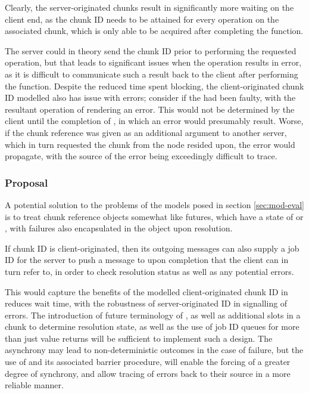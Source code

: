 Clearly, the server-originated chunks result in significantly more waiting on the client end, as the chunk ID needs to be attained for every operation on the associated chunk, which is only able to be acquired after completing the function.

The server could in theory send the chunk ID prior to performing the requested operation, but that leads to significant issues when the operation results in error, as it is difficult to communicate such a result back to the client after performing the function.
Despite the reduced time spent blocking, the client-originated chunk ID modelled also has issue with errors; consider if the  had been faulty, with the resultant operation of  rendering an error.
This would not be determined by the client until the completion of , in which an error would presumably result.
Worse, if the chunk reference  was given as an additional argument to another server, which in turn requested the chunk  from the node  resided upon, the error would propagate, with the source of the error being exceedingly difficult to trace.

\subsubsection{Proposal}

A potential solution to the problems of the models posed in section \cref{sec:mod-eval} is to treat chunk reference objects somewhat like futures, which have a state of  or , with failures also encapsulated in the object upon resolution\cite{bengtsson20:future-r}.

If chunk ID is client-originated, then its outgoing messages can also supply a job ID for the server to push a message to upon completion that the client can in turn refer to, in order to check resolution status as well as any potential errors.

This would capture the benefits of the modelled client-originated chunk ID in reduces wait time, with the robustness of server-originated ID in signalling of errors.
The introduction of future terminology of , as well as additional slots in a chunk to determine resolution state, as well as the use of job ID queues for more than just value returns will be sufficient to implement such a design.
The asynchrony may lead to non-deterministic outcomes in the case of failure, but the use of  and its associated barrier procedure,  will enable the forcing of a greater degree of synchrony, and allow tracing of errors back to their source in a more reliable manner.

